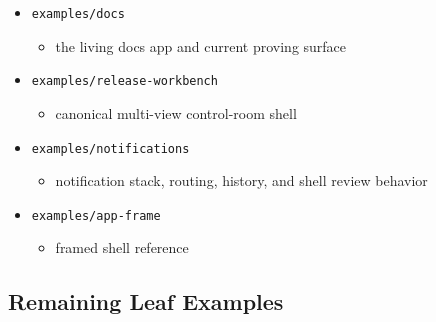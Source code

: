 \begin{itemize}
\tightlist
\item
  \texttt{e\allowbreak{}x\allowbreak{}a\allowbreak{}m\allowbreak{}p\allowbreak{}l\allowbreak{}e\allowbreak{}s\allowbreak{}/\allowbreak{}d\allowbreak{}o\allowbreak{}c\allowbreak{}s}

  \begin{itemize}
  \tightlist
  \item
    the living docs app and current proving surface
  \end{itemize}
\item
  \texttt{e\allowbreak{}x\allowbreak{}a\allowbreak{}m\allowbreak{}p\allowbreak{}l\allowbreak{}e\allowbreak{}s\allowbreak{}/\allowbreak{}r\allowbreak{}e\allowbreak{}l\allowbreak{}e\allowbreak{}a\allowbreak{}s\allowbreak{}e\allowbreak{}-\allowbreak{}w\allowbreak{}o\allowbreak{}r\allowbreak{}k\allowbreak{}b\allowbreak{}e\allowbreak{}n\allowbreak{}c\allowbreak{}h}

  \begin{itemize}
  \tightlist
  \item
    canonical multi-view control-room shell
  \end{itemize}
\item
  \texttt{e\allowbreak{}x\allowbreak{}a\allowbreak{}m\allowbreak{}p\allowbreak{}l\allowbreak{}e\allowbreak{}s\allowbreak{}/\allowbreak{}n\allowbreak{}o\allowbreak{}t\allowbreak{}i\allowbreak{}f\allowbreak{}i\allowbreak{}c\allowbreak{}a\allowbreak{}t\allowbreak{}i\allowbreak{}o\allowbreak{}n\allowbreak{}s}

  \begin{itemize}
  \tightlist
  \item
    notification stack, routing, history, and shell review behavior
  \end{itemize}
\item
  \texttt{e\allowbreak{}x\allowbreak{}a\allowbreak{}m\allowbreak{}p\allowbreak{}l\allowbreak{}e\allowbreak{}s\allowbreak{}/\allowbreak{}a\allowbreak{}p\allowbreak{}p\allowbreak{}-\allowbreak{}f\allowbreak{}r\allowbreak{}a\allowbreak{}m\allowbreak{}e}

  \begin{itemize}
  \tightlist
  \item
    framed shell reference
  \end{itemize}
\end{itemize}

\subsection{Remaining Leaf Examples}\label{record-007-remaining-leaf-examples}


